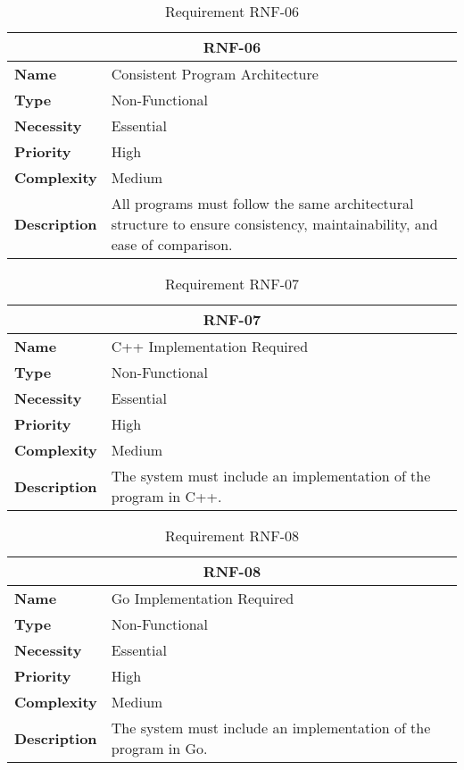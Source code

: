 \begin{table}[H]
    \centering
    \begin{tabular}{l p{10cm}}
        \toprule
        \multicolumn{2}{c}{\textbf{RNF-06}} \\
        \toprule
        \textbf{Name}         & Consistent Program Architecture \\
        \textbf{Type}         & Non-Functional \\
        \textbf{Necessity}    & Essential \\
        \textbf{Priority}     & High \\
        \textbf{Complexity}   & Medium \\
        \textbf{Description}  & All programs must follow the same architectural structure to ensure consistency, maintainability, and ease of comparison. \\
        \bottomrule
    \end{tabular}
\caption{Requirement RNF-06}\label{tab:rnf-06}
\end{table}

\begin{table}[H]
    \centering
    \begin{tabular}{l p{10cm}}
        \toprule
        \multicolumn{2}{c}{\textbf{RNF-07}} \\
        \toprule
        \textbf{Name}         & C++ Implementation Required \\
        \textbf{Type}         & Non-Functional \\
        \textbf{Necessity}    & Essential \\
        \textbf{Priority}     & High \\
        \textbf{Complexity}   & Medium \\
        \textbf{Description}  & The system must include an implementation of the program in C++. \\
        \bottomrule
    \end{tabular}
\caption{Requirement RNF-07}\label{tab:rnf-07}
\end{table}

\begin{table}[H]
    \centering
    \begin{tabular}{l p{10cm}}
        \toprule
        \multicolumn{2}{c}{\textbf{RNF-08}} \\
        \toprule
        \textbf{Name}         & Go Implementation Required \\
        \textbf{Type}         & Non-Functional \\
        \textbf{Necessity}    & Essential \\
        \textbf{Priority}     & High \\
        \textbf{Complexity}   & Medium \\
        \textbf{Description}  & The system must include an implementation of the program in Go. \\
        \bottomrule
    \end{tabular}
\caption{Requirement RNF-08}\label{tab:rnf-08}
\end{table}

